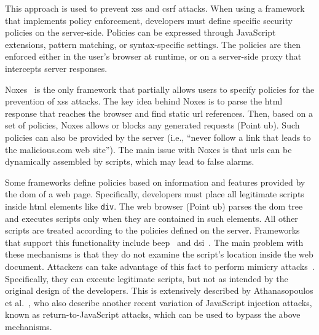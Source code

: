 \documentclass[10pt,journal,compsoc]{IEEEtran}
\begin{document}
This approach is used to prevent {\sc xss} and {\sc csrf} attacks. When
using a framework that implements policy enforcement, developers must
define specific security policies on the server-side. Policies can be
expressed through JavaScript extensions, pattern matching, or
syntax-specific settings. The policies are then enforced either in the user's
browser at runtime, or on a server-side proxy that intercepts server
responses.

Noxes~\cite{KJKV09} is the only
framework that partially allows
users to specify policies for the prevention of {\sc xss} attacks.
The key idea behind Noxes is to parse
the {\sc html} response that reaches the browser and
find static {\sc url} references. Then, based on
a set of policies, Noxes allows or blocks
any generated requests (Point {\sc ub}). Such policies
can also be provided by the server (i.e., ``never
follow a link that leads to the malicious.com
web site''). The main issue with Noxes is that
{\sc url}s can be dynamically assembled by scripts,
which may lead to false alarms.

\vspace{-1mm}
Some frameworks define policies based on information and
features provided by the {\sc dom} of a web
page. Specifically, developers must place all legitimate scripts
inside {\sc html} elements like {\tt div}. The web browser (Point {\sc
  ub}) parses the {\sc dom} tree and executes scripts only when they
are contained in such elements. All other scripts are treated
according to the policies defined on the server. Frameworks that
support this functionality include {\sc beep}~\cite{TNH07} and {\sc
  dsi}~\cite{NSS06}. The main problem with these mechanisms is that
they do not examine the script's location inside the web document.
Attackers can take advantage of this fact to perform mimicry attacks~\cite{WS02}.
Specifically, they can execute legitimate scripts, but not as intended
by the original design of the developers. This is extensively
described by Athanasopoulos et al.~\cite{APKLM10}, who also describe
another recent variation of JavaScript injection attacks, known as
return-to-JavaScript attacks, which can be used to bypass the above
mechanisms.
\end{document}

